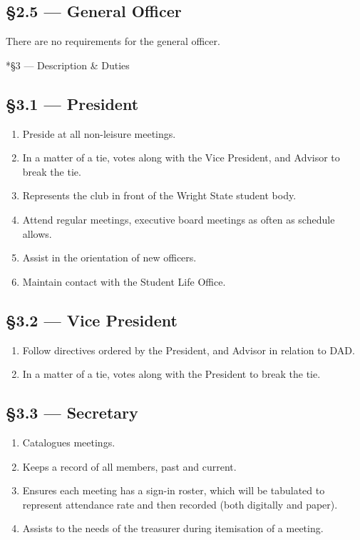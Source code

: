 \documentclass[11pt]{report}
\makeatletter
\renewcommand{\section}{\@startsection{subsection}{2}{0mm}{-\baselineskip}{0.5\baselineskip}{\normalfont\large\bf}}
\makeatother
\begin{document}
	\subsection*{\S2.5 --- General Officer}
	There are no requirements for the general officer.
	
	\section*{\S3 --- Description \& Duties}
	\subsection*{\S3.1 --- President}
	\begin{enumerate}
		\item Preside at all non-leisure meetings.
		\item In a matter of a tie, votes along with the Vice President, and Advisor to break the tie.
		\item Represents the club in front of the Wright State student body.
		\item Attend regular meetings, executive board meetings as often as schedule allows.  
		\item Assist in the orientation of new officers.
		\item Maintain contact with the Student Life Office.  
	\end{enumerate}
	\subsection*{\S3.2 --- Vice President}
	\begin{enumerate}
		\item Follow directives ordered by the President, and Advisor in relation to DAD.
		\item In a matter of a tie, votes along with the President to break the tie.
	\end{enumerate}
	\subsection*{\S3.3 --- Secretary}
	\begin{enumerate}
		\item Catalogues meetings.
		\item Keeps a record of all members, past and current.
		\item Ensures each meeting has a sign-in roster, which will be tabulated to represent attendance rate and then recorded (both digitally and paper).
		\item Assists to the needs of the treasurer during itemisation of a meeting.
	\end{enumerate}
\end{document}
